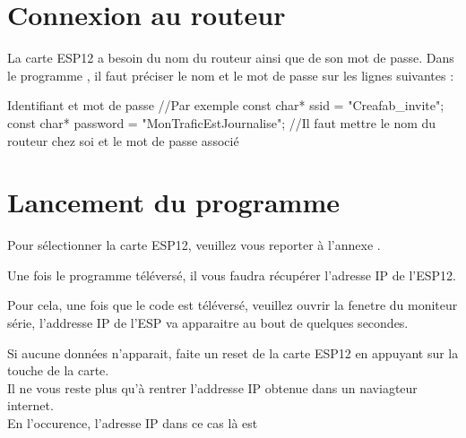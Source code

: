 \section{Connexion au routeur}

La carte ESP12 a besoin du nom du routeur ainsi que de son mot de passe. 
Dans le programme , il faut préciser le nom et le mot de passe sur les lignes suivantes : 

\begin{Cpp}{Identifiant et mot de passe}
//Par exemple
const char* ssid     = "Creafab_invite";
const char* password = "MonTraficEstJournalise";
//Il faut mettre le nom du routeur chez soi et le mot de passe associé
\end{Cpp}



\section{Lancement du programme}

Pour sélectionner la carte ESP12, veuillez vous reporter à l'annexe .

Une fois le programme téléversé, il vous faudra récupérer l'adresse IP de l'ESP12.


Pour cela, une fois que le code est téléversé, veuillez ouvrir la fenetre du moniteur série, l'addresse IP de l'ESP va apparaitre au bout de quelques secondes.\\


Si aucune données n'apparait, faite un reset de la carte ESP12 en appuyant sur la touche  de la carte.\\

Il ne vous reste plus qu'à rentrer l'addresse IP obtenue dans un naviagteur internet.\\
En l'occurence, l'adresse IP dans ce cas là est 


